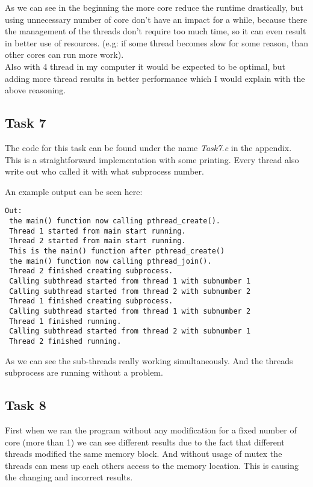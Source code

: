 As we can see in the beginning the more core reduce the runtime drastically, but using unnecessary number of core don't have an impact for a while, because there the management of the threads don't require too much time, so it can even result in better use of resources. (e.g: if some thread becomes slow for some reason, than other cores can run more work). \\
Also with 4 thread in my computer it would be expected to be optimal, but adding more thread results in better performance which I would explain with the above reasoning.
\subsection*{Task 7}

The code for this task can be found under the name \textit{Task7.c} in the appendix. This is a straightforward implementation with some printing. Every thread also write out who called it with what subprocess number.

An example output can be seen here:

\begin{lstlisting}
Out: 
 the main() function now calling pthread_create().
 Thread 1 started from main start running.
 Thread 2 started from main start running.
 This is the main() function after pthread_create()
 the main() function now calling pthread_join().
 Thread 2 finished creating subprocess.
 Calling subthread started from thread 1 with subnumber 1
 Calling subthread started from thread 2 with subnumber 2
 Thread 1 finished creating subprocess.
 Calling subthread started from thread 1 with subnumber 2
 Thread 1 finished running.
 Calling subthread started from thread 2 with subnumber 1
 Thread 2 finished running.
\end{lstlisting}

As we can see the sub-threads really working simultaneously. And the threads subprocess are running without a problem.  

\subsection*{Task 8}
First when we ran the program without any modification for a fixed number of core (more than 1) we can see different results due to the fact that different threads modified the same memory block. And without usage of mutex the threads can mess up each others access to the memory location. This is causing the changing and incorrect results. 

